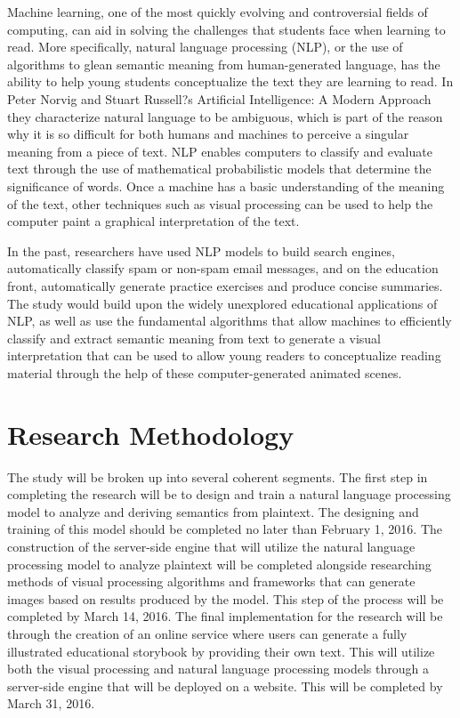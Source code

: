 \documentclass[12pt]{article}
\begin{document}
Machine learning, one of the most quickly evolving and controversial fields of computing, can aid in solving the challenges that students face when learning to read. More specifically, natural language processing (NLP), or the use of algorithms to glean semantic meaning from human-generated language, has the ability to help young students conceptualize the text they are learning to read. In Peter Norvig and Stuart Russell?s Artificial Intelligence: A Modern Approach they characterize natural language to be ambiguous, which is part of the reason why it is so difficult for both humans and machines to perceive a singular meaning from a piece of text. NLP enables computers to classify and evaluate text through the use of mathematical probabilistic models that determine the significance of words. Once a machine has a basic understanding of the meaning of the text, other techniques such as visual processing can be used to help the computer paint a graphical interpretation of the text.

In the past, researchers have used NLP models to build search engines, automatically classify spam or non-spam email messages, and on the education front, automatically generate practice exercises and produce concise summaries. The study would build upon the widely unexplored educational applications of NLP, as well as use the fundamental algorithms that allow machines to efficiently classify and extract semantic meaning from text to generate a visual interpretation that can be used to allow young readers to conceptualize reading material through the help of these computer-generated animated scenes.

\section{Research Methodology}
The study will be broken up into several coherent segments. The first step in completing the research will be to design and train a natural language processing model to analyze and deriving semantics from plaintext. The designing and training of this model should be completed no later than February 1, 2016. The construction of the server-side engine that will utilize the natural language processing model to analyze plaintext will be completed alongside researching methods of visual processing algorithms and frameworks that can generate images based on results produced by the model. This step of the process will be completed by March 14, 2016. The final implementation for the research will be through the creation of an online service where users can generate a fully illustrated educational storybook by providing their own text. This will utilize both the visual processing and natural language processing models through a server-side engine that will be deployed on a website. This will be completed by March 31, 2016.
\end{document}
